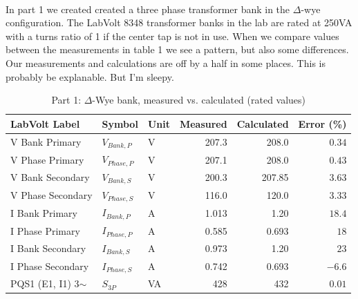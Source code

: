 \paragraph{} In part 1 we created created a three phase transformer bank in the $\Delta$-wye configuration. The LabVolt 8348
transformer banks in the lab are rated at 250VA with a turns ratio of 1 if the center tap is not in use. When we compare values
between the measurements in table 1 we see a pattern, but also some differences. Our measurements and calculations are off by
a half in some places. This is probably be explanable. But I'm sleepy.

\begin{table}[htbp]
	\centering
	\caption{Part 1: $\Delta$-Wye bank, measured vs. calculated (rated values)}
	\label{tab:part1}
	\begin{tabular}{lllrrr}
		\toprule
		\textbf{LabVolt Label} & \textbf{Symbol} & \textbf{Unit} & \textbf{Measured} & \textbf{Calculated} & \textbf{Error (\%)} \\
		\midrule
		V Bank Primary         & $V_{Bank,P}$    & V             & 207.3             & 208.0               & $0.34$              \\
		V Phase Primary        & $V_{Phase,P}$   & V             & 207.1             & 208.0               & $0.43$              \\
		V Bank Secondary       & $V_{Bank,S}$    & V             & 200.3             & 207.85              & $3.63$              \\
		V Phase Secondary      & $V_{Phase,S}$   & V             & 116.0             & 120.0               & $3.33$              \\
		I Bank Primary         & $I_{Bank,P}$    & A             & 1.013             & 1.20                & $18.4$              \\
		I Phase Primary        & $I_{Phase,P}$   & A             & 0.585             & 0.693               & $18$                \\
		I Bank Secondary       & $I_{Bank,S}$    & A             & 0.973             & 1.20                & $23$                \\
		I Phase Secondary      & $I_{Phase,S}$   & A             & 0.742             & 0.693               & $-6.6$              \\
		PQS1 (E1, I1) 3$\sim$  & $S_{3P}$        & VA            & 428               & 432                 & $0.01$              \\
		\bottomrule
	\end{tabular}
\end{table}


